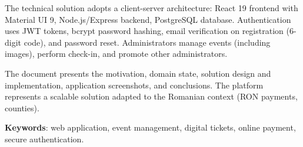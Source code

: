 The technical solution adopts a client-server architecture: React 19 frontend with Material UI 9, Node.js/Express backend, PostgreSQL database. Authentication uses JWT tokens, bcrypt password hashing, email verification on registration (6-digit code), and password reset. Administrators manage events (including images), perform check-in, and promote other administrators.

The document presents the motivation, domain state, solution design and implementation, application screenshots, and conclusions. The platform represents a scalable solution adapted to the Romanian context (RON payments, counties).

\textbf{Keywords}: web application, event management, digital tickets, online payment, secure authentication.

\clearpage